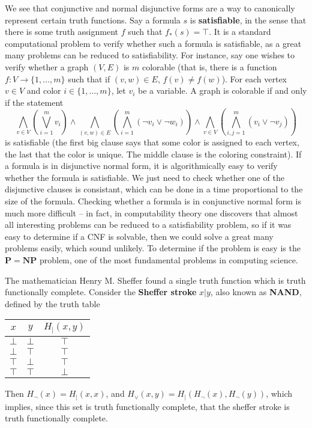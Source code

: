 We see that conjunctive and normal disjunctive forms are a way to canonically represent certain truth functions. Say a formula $s$ is {\bf satisfiable}, in the sense that there is some truth assignment $f$ such that $f_*(s) = \top$. It is a standard computational problem to verify whether such a formula is satisfiable, as a great many problems can be reduced to satisfiability. For instance, say one wishes to verify whether a graph $(V,E)$ is $m$ colorable (that is, there is a function $f: V \to \{ 1, \dots, m \}$ such that if $(v,w) \in E$, $f(v) \neq f(w)$). For each vertex $v \in V$ and color $i \in \{ 1, \dots, m \}$, let $v_i$ be a variable. A graph is colorable if and only if the statement
%
\[ \bigwedge_{v \in V} \left( \bigvee_{i = 1}^m v_i \right) \wedge \bigwedge_{(v,w) \in E} \left( \bigwedge_{i = 1}^m (\neg v_i \vee \neg w_i) \right) \wedge \bigwedge_{v \in V} \left( \bigwedge_{i,j = 1}^m (v_i \vee \neg v_j) \right) \]
%
is satisfiable (the first big clause says that some color is assigned to each vertex, the last that the color is unique. The middle clause is the coloring constraint). If a formula is in disjunctive normal form, it is algorithmically easy to verify whether the formula is satisfiable. We just need to check whether one of the disjunctive clauses is consistant, which can be done in a time proportional to the size of the formula. Checking whether a formula is in conjunctive normal form is much more difficult -- in fact, in computability theory one discovers that almost all interesting problems can be reduced to a satisfiability problem, so if it was easy to determine if a CNF is solvable, then we could solve a great many problems easily, which sound unlikely. To determine if the problem is easy is the $\mathbf{P} = \mathbf{NP}$ problem, one of the most fundamental problems in computing science.

\begin{example}
    The mathematician Henry M. Sheffer found a single truth function which is truth functionally complete. Consider the {\bf Sheffer stroke} $x|y$, also known as {\bf NAND}, defined by the truth table
    \begin{center}
    \begin{tabular}{| c | c | c |}
        \hline $x$ & $y$ & $H_|(x,y)$\\
        \hline $\bot$ & $\bot$ & $\top$\\
        $\bot$ & $\top$ & $\top$\\
        $\top$ & $\bot$ & $\top$\\
        $\top$ & $\top$ & $\bot$\\
        \hline
    \end{tabular}
    \end{center}
    Then $H_\neg(x) = H_|(x,x)$, and $H_\vee(x,y) = H_|(H_\neg(x), H_\neg(y))$, which implies, since this set is truth functionally complete, that the sheffer stroke is truth functionally complete.
\end{example}

